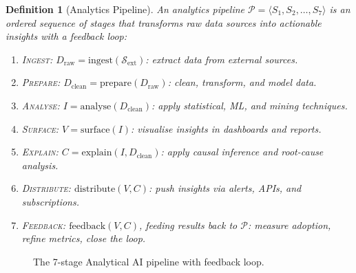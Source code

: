 \documentclass[12pt, a4paper]{article}
\newtheorem{definition}{Definition}
\begin{document}
\begin{definition}[Analytics Pipeline]
An analytics pipeline $\mathcal{P} = \langle S_1, S_2, \ldots, S_7 \rangle$ is an ordered sequence of stages that transforms raw data sources into actionable insights with a feedback loop:
\begin{enumerate}
    \item \textsc{Ingest}: $D_{\text{raw}} = \text{ingest}(\mathcal{S}_{\text{ext}})$: extract data from external sources.
    \item \textsc{Prepare}: $D_{\text{clean}} = \text{prepare}(D_{\text{raw}})$: clean, transform, and model data.
    \item \textsc{Analyse}: $I = \text{analyse}(D_{\text{clean}})$: apply statistical, ML, and mining techniques.
    \item \textsc{Surface}: $V = \text{surface}(I)$: visualise insights in dashboards and reports.
    \item \textsc{Explain}: $C = \text{explain}(I, D_{\text{clean}})$: apply causal inference and root-cause analysis.
    \item \textsc{Distribute}: $\text{distribute}(V, C)$: push insights via alerts, APIs, and subscriptions.
    \item \textsc{Feedback}: $\text{feedback}(V, C)$, feeding results back to $\mathcal{P}$: measure adoption, refine metrics, close the loop.
\end{enumerate}
\end{definition}

\begin{figure}[ht]
\centering
{}
\caption{The 7-stage Analytical AI pipeline with feedback loop.}
\label{fig:pipeline}
\end{figure}
\end{document}
